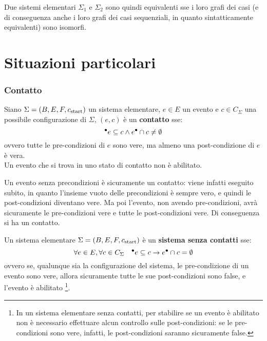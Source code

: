 \begin{rem}
    Due sistemi elementari $\Sigma_1$ e $\Sigma_2$ sono quindi equivalenti sse i loro grafi dei casi (e di conseguenza anche i loro grafi dei casi sequenziali, in quanto sintatticamente equivalenti) sono isomorfi.
\end{rem}

\section{Situazioni particolari}
\subsubsection{Contatto}
\begin{defn}
    Siano $\Sigma = (B, E, F, c_{\textnormal{start}})$ un sistema elementare, $e \in E$ un evento e $c \in C_{\Sigma}$ una possibile configurazione di $\Sigma$, $(e, c)$ è un \textbf{contatto} sse:
    \[
        {^\bullet}e \subseteq c \land e^\bullet \cap c \neq \emptyset
    \]
    ovvero tutte le pre-condizioni di $e$ sono vere, ma almeno una post-condizione di $e$ è vera.\\
    Un evento che si trova in uno stato di contatto non è abilitato.
\end{defn}

\begin{rem}
    Un evento senza precondizioni è sicuramente un contatto: viene infatti eseguito subito, in quanto l'insieme vuoto delle precondizioni è sempre vero, e quindi le post-condizioni diventano vere. Ma poi l'evento, non avendo pre-condizioni, avrà sicuramente le pre-condizioni vere e tutte le post-condizioni vere. Di conseguenza si ha un contatto. 
\end{rem}

\begin{defn}
    Un sistema elementare $\Sigma = (B, E, F, c_{\textnormal{start}})$ è un \textbf{sistema senza contatti} sse:
    \[
        \forall e \in E, \forall c \in C_{\Sigma} \quad {^\bullet}e \subseteq c \rightarrow e^\bullet \cap c = \emptyset
    \]
    ovvero se, qualunque sia la configurazione del sistema, le pre-condizione di un evento sono vere, allora sicuramente tutte le sue post-condizioni sono false, e l'evento è abilitato \footnote{In un sistema elementare senza contatti, per stabilire se un evento è abilitato non è necessario effettuare alcun controllo sulle post-condizioni: se le pre-condizioni sono vere, infatti, le post-condizioni saranno sicuramente false.}.
\end{defn}

